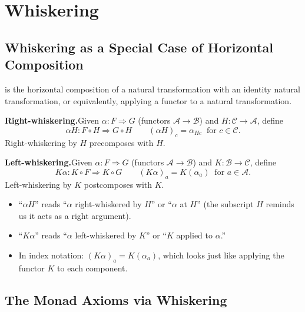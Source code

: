 \section{Whiskering}
\label{sec:whiskering}

\subsection{Whiskering as a Special Case of Horizontal Composition}

 is the horizontal composition of a natural transformation
with an identity natural transformation, or equivalently, applying a
functor to a natural transformation.

\textbf{Right-whiskering.}\quad Given $\alpha: F \Rightarrow G$ (functors
$\mathcal{A} \to \mathcal{B}$) and $H: \mathcal{C} \to \mathcal{A}$, define
\[
  \alpha H : F \circ H \Rightarrow G \circ H
  \qquad (\alpha H)_c = \alpha_{Hc} \;\; \text{for } c \in \mathcal{C}.
\]
Right-whiskering by $H$ precomposes with $H$.

\textbf{Left-whiskering.}\quad Given $\alpha: F \Rightarrow G$ (functors
$\mathcal{A} \to \mathcal{B}$) and $K: \mathcal{B} \to \mathcal{C}$, define
\[
  K\alpha : K \circ F \Rightarrow K \circ G
  \qquad (K\alpha)_a = K(\alpha_a) \;\; \text{for } a \in \mathcal{A}.
\]
Left-whiskering by $K$ postcomposes with $K$.

\begin{howtosay}
\begin{itemize}
  \item ``$\alpha H$'' reads ``$\alpha$ right-whiskered by $H$'' or
        ``$\alpha$ at $H$'' (the subscript $H$ reminds us it acts as a
        right argument).
  \item ``$K\alpha$'' reads ``$\alpha$ left-whiskered by $K$'' or
        ``$K$ applied to $\alpha$.''
  \item In index notation: $(K\alpha)_a = K(\alpha_a)$, which looks just
        like applying the functor $K$ to each component.
\end{itemize}
\end{howtosay}

\subsection{The Monad Axioms via Whiskering}

